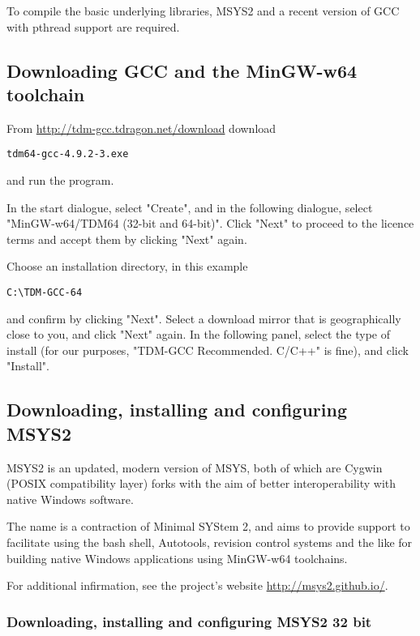 To compile the basic underlying libraries, MSYS2 and a recent version of GCC with pthread support are required. 


\subsection{Downloading GCC and the MinGW-w64 toolchain}

From \href{http://tdm-gcc.tdragon.net/download}{http://tdm-gcc.tdragon.net/download} download
\begin{verbatim}
tdm64-gcc-4.9.2-3.exe
\end{verbatim}
and run the program.

In the start dialogue, select "Create", and in the following dialogue, select  "MinGW-w64/TDM64 (32-bit and 64-bit)". Click "Next" to proceed to the licence terms and accept them by clicking "Next" again.

Choose an installation directory, in this example

\begin{verbatim}
C:\TDM-GCC-64
\end{verbatim}

and confirm by clicking "Next". Select a download mirror that is geographically close to you, and click "Next" again. In the following panel, select the type of install (for our purposes, "TDM-GCC Recommended. C/C++" is fine), and click "Install".



\subsection{Downloading, installing and configuring MSYS2}
MSYS2 is an updated, modern version of MSYS, both of which are Cygwin (POSIX compatibility layer) forks with the aim of better interoperability with native Windows software.

The name is a contraction of Minimal SYStem 2, and aims to provide support to facilitate using the bash shell, Autotools, revision control systems and the like for building native Windows applications using MinGW-w64 toolchains.

For additional infirmation, see the project's website \href{http://msys2.github.io/}{http://msys2.github.io/}.


\subsubsection{Downloading, installing and configuring MSYS2 32 bit}

